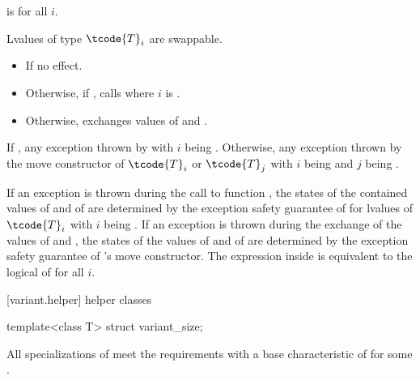 \begin{itemdescr}
\pnum
\mandates
{} is  for all $i$.

\pnum
\expects
Lvalues of type $\tcode{T}_i$ are swappable.

\pnum
\effects
\begin{itemize}
\item
If  no effect.
\item
Otherwise, if , calls  where $i$ is .
\item
Otherwise, exchanges values of  and .
\end{itemize}

\pnum
\throws
If ,
any exception thrown by 
with $i$ being .
Otherwise, any exception thrown by the move constructor
of $\tcode{T}_i$ or $\tcode{T}_j$
with $i$ being  and $j$ being .

\pnum
\remarks
If an exception is thrown during the call to function ,
the states of the contained values of  and of  are
determined by the exception safety guarantee of  for lvalues of
$\tcode{T}_i$ with $i$ being .
If an exception is thrown during the exchange of the values of 
and , the states of the values of  and of 
are determined by the exception safety guarantee of 's move constructor.
The expression inside  is equivalent to the logical  of
 for all $i$.
\end{itemdescr}

[variant.helper]{ helper classes}

%
\begin{itemdecl}
template<class T> struct variant_size;
\end{itemdecl}

\begin{itemdescr}
\pnum
All specializations of  meet the
 requirements
with a base characteristic of  for some .
\end{itemdescr}

